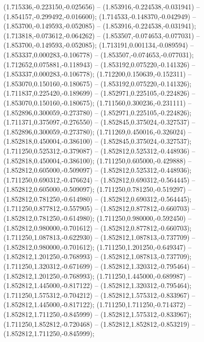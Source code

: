  (1.715336,-0.223150,-0.025656) -- (1.853916,-0.224538,-0.031941) -- (1.854157,-0.299492,-0.016600);
 (1.714533,-0.148370,-0.042949) -- (1.853700,-0.149593,-0.052085) -- (1.853916,-0.224538,-0.031941);
 (1.713818,-0.073612,-0.064262) -- (1.853507,-0.074653,-0.077031) -- (1.853700,-0.149593,-0.052085);
 (1.713191,0.001134,-0.089594) -- (1.853337,0.000283,-0.106778) -- (1.853507,-0.074653,-0.077031);
 (1.712652,0.075881,-0.118943) -- (1.853192,0.075220,-0.141326) -- (1.853337,0.000283,-0.106778);
 (1.712200,0.150639,-0.152311) -- (1.853070,0.150160,-0.180675) -- (1.853192,0.075220,-0.141326);
 (1.711837,0.225420,-0.189699) -- (1.852971,0.225105,-0.224826) -- (1.853070,0.150160,-0.180675);
 (1.711560,0.300236,-0.231111) -- (1.852896,0.300059,-0.273780) -- (1.852971,0.225105,-0.224826);
 (1.711371,0.375097,-0.276550) -- (1.852845,0.375024,-0.327537) -- (1.852896,0.300059,-0.273780);
 (1.711269,0.450016,-0.326024) -- (1.852818,0.450004,-0.386100) -- (1.852845,0.375024,-0.327537);
 (1.711250,0.525312,-0.379087) -- (1.852812,0.525312,-0.448936) -- (1.852818,0.450004,-0.386100);
 (1.711250,0.605000,-0.429888) -- (1.852812,0.605000,-0.509097) -- (1.852812,0.525312,-0.448936);
 (1.711250,0.690312,-0.476624) -- (1.852812,0.690312,-0.564445) -- (1.852812,0.605000,-0.509097);
 (1.711250,0.781250,-0.519297) -- (1.852812,0.781250,-0.614980) -- (1.852812,0.690312,-0.564445);
 (1.711250,0.877812,-0.557905) -- (1.852812,0.877812,-0.660703) -- (1.852812,0.781250,-0.614980);
 (1.711250,0.980000,-0.592450) -- (1.852812,0.980000,-0.701612) -- (1.852812,0.877812,-0.660703);
 (1.711250,1.087813,-0.622930) -- (1.852812,1.087813,-0.737709) -- (1.852812,0.980000,-0.701612);
 (1.711250,1.201250,-0.649347) -- (1.852812,1.201250,-0.768993) -- (1.852812,1.087813,-0.737709);
 (1.711250,1.320312,-0.671699) -- (1.852812,1.320312,-0.795464) -- (1.852812,1.201250,-0.768993);
 (1.711250,1.445000,-0.689987) -- (1.852812,1.445000,-0.817122) -- (1.852812,1.320312,-0.795464);
 (1.711250,1.575312,-0.704212) -- (1.852812,1.575312,-0.833967) -- (1.852812,1.445000,-0.817122);
 (1.711250,1.711250,-0.714372) -- (1.852812,1.711250,-0.845999) -- (1.852812,1.575312,-0.833967);
 (1.711250,1.852812,-0.720468) -- (1.852812,1.852812,-0.853219) -- (1.852812,1.711250,-0.845999);
